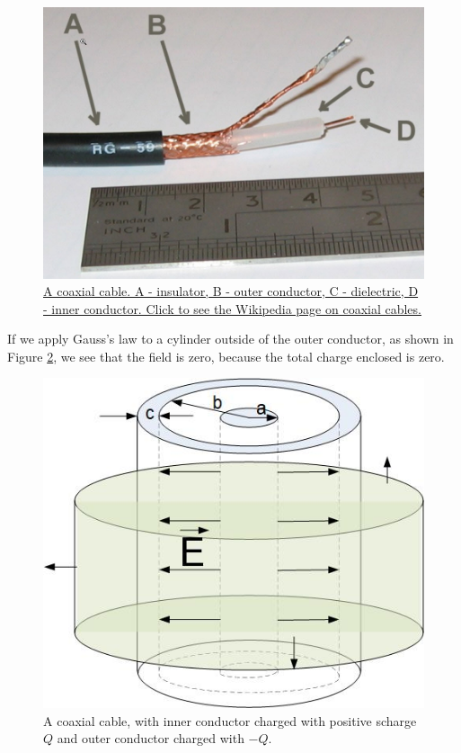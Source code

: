 \documentclass{ximera}
\begin{document}
\begin{figure}[htbp]
\begin{center}
\includegraphics[scale=0.3]{../jpg/coaxialCable.jpg}
\end{center}
\caption{\href{https://en.wikipedia.org/wiki/Coaxial_cable}{A coaxial cable. A - insulator, B - outer conductor, C - dielectric, D - inner conductor. Click to see the Wikipedia page on coaxial cables. } }
\label{fig:coax}
\end{figure}


If we apply Gauss's law to a cylinder outside of the outer conductor, as shown in Figure \ref{fig:coaxialCapacitorGaussOutside}, we see that the field is zero, because the total charge enclosed is zero. 

\begin{figure}[htbp]
\begin{center}
\includegraphics[scale=0.5]{../jpg/coax2.jpg}
\end{center}
\caption{A coaxial cable, with inner conductor charged with positive scharge $Q$ and outer conductor charged with $-Q.$}
\label{fig:coaxialCapacitorGaussOutside}
\end{figure}
\end{document}
